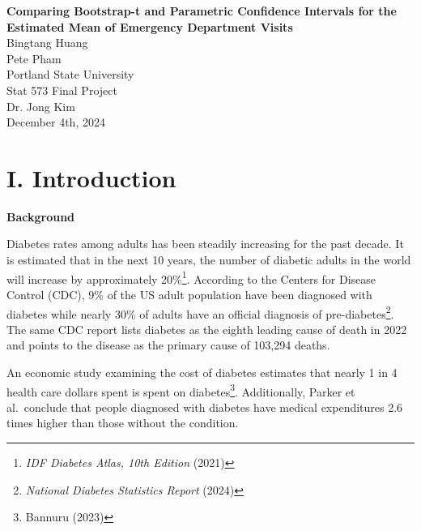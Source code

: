 \documentclass[
]{article}
\author{}
\date{\vspace{-2.5em}}
\begin{document}
\onehalfspacing
{}

\begin{center}
\LARGE{\textbf{Comparing Bootstrap-t and Parametric Confidence Intervals for the Estimated Mean of Emergency Department Visits}}\\
\vspace*{5\baselineskip}
\normalsize{Bingtang Huang}\\
\normalsize{Pete Pham}\\
\vspace*{5\baselineskip}
\normalsize{Portland State University}\\
\normalsize{Stat 573 Final Project}\\
\normalsize{Dr. Jong Kim}\\
\normalsize{December 4th, 2024}\\
\vspace*{2\baselineskip}
\vspace*{3\baselineskip}
\vspace*{2\baselineskip}


\vspace*{1\baselineskip}

\vspace*{1\baselineskip}

\end{center}

\newpage

\section{I. Introduction}\label{i.-introduction}

\textbf{Background}

Diabetes rates among adults has been steadily increasing for the past
decade. It is estimated that in the next 10 years, the number of
diabetic adults in the world will increase by approximately
20\%\footnote{\emph{IDF Diabetes Atlas, 10th Edition} (2021)}. According
to the Centers for Disease Control (CDC), 9\% of the US adult population
have been diagnosed with diabetes while nearly 30\% of adults have an
official diagnosis of pre-diabetes\footnote{\emph{National Diabetes
  Statistics Report} (2024)}. The same CDC report lists diabetes as the
eighth leading cause of death in 2022 and points to the disease as the
primary cause of 103,294 deaths.

An economic study examining the cost of diabetes estimates that nearly 1
in 4 health care dollars spent is spent on diabetes\footnote{Bannuru
  (2023)}. Additionally, Parker et al.~conclude that people diagnosed
with diabetes have medical expenditures 2.6 times higher than those
without the condition.
\end{document}

